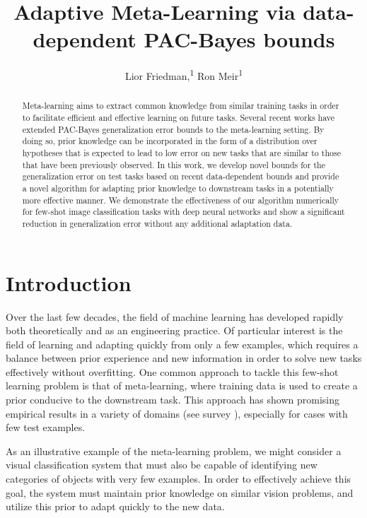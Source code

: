 \documentclass[letterpaper]{article} %
\title{Adaptive Meta-Learning via data-dependent PAC-Bayes bounds}
\author{
	Lior Friedman,\textsuperscript{\rm 1}
	Ron Meir\textsuperscript{\rm 1}
}
\theoremstyle{definition}
\begin{document}
	
\maketitle

\begin{abstract}
	Meta-learning aims to extract common knowledge from similar training tasks in order to facilitate efficient and effective learning on future tasks. Several recent works have extended PAC-Bayes generalization error bounds to the meta-learning setting.
	By doing so, prior knowledge can be incorporated in the form of a distribution over hypotheses that is expected to lead to low error on new tasks that are similar to those that have been previously observed.
	In this work, we develop novel bounds for the generalization error on test tasks based on recent data-dependent bounds and provide a novel algorithm for adapting prior knowledge to downstream tasks in a potentially more effective manner.
	We demonstrate the effectiveness of our algorithm numerically for few-shot image classification tasks with deep neural networks and show a significant reduction in generalization error without any additional adaptation data.
\end{abstract}

\section{Introduction}

Over the last few decades, the field of machine learning has developed rapidly both theoretically and as an engineering practice. Of particular interest is the field of learning and adapting quickly from only a few examples, which requires a balance between prior experience and new information in order to solve new tasks effectively without overfitting.
One common approach to tackle this few-shot learning problem is that of meta-learning, where training data is used to create a prior conducive to the downstream task. This approach has shown promising empirical results in a variety of domains (see survey \citep{Hospedales2021}), especially for cases with few test examples.

As an illustrative example of the meta-learning problem, we might consider a visual classification system that must also be capable of identifying new categories of objects with very few examples. In order to effectively achieve this goal, the system must maintain prior knowledge on similar vision problems, and utilize this prior to adapt quickly to the new data.
\end{document}
